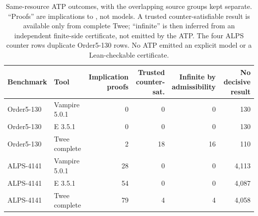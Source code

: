 \begin{table}[t]
\caption{Same-resource ATP outcomes, with the overlapping source groups kept
separate.  ``Proofs'' are implications to , not models.  A trusted
counter-satisfiable result is available only from complete Twee; ``infinite''
is then inferred from an independent finite-side certificate, not emitted by
the ATP.  The four ALPS counter rows duplicate Order5-130 rows.  No ATP emitted
an explicit model or a Lean-checkable certificate.}
\label{tab:same-resource-atp}
\centering
\scriptsize
\setlength{\tabcolsep}{2.5pt}
\begin{tabular}{@{}llrrrr@{}}
\toprule
Benchmark & Tool & \shortstack{Implication\\proofs} &
\shortstack{Trusted\\counter-sat.} &
\shortstack{Infinite by\\admissibility} &
\shortstack{No\\decisive result} \\
\midrule
Order5-130 & Vampire 5.0.1 & 0 & 0 & 0 & 130 \\
Order5-130 & E 3.5.1 & 0 & 0 & 0 & 130 \\
Order5-130 & Twee complete & 2 & 18 & 16 & 110 \\
\midrule
ALPS-4141 & Vampire 5.0.1 & 28 & 0 & 0 & 4,113 \\
ALPS-4141 & E 3.5.1 & 54 & 0 & 0 & 4,087 \\
ALPS-4141 & Twee complete & 79 & 4 & 4 & 4,058 \\
\bottomrule
\end{tabular}
\end{table}
